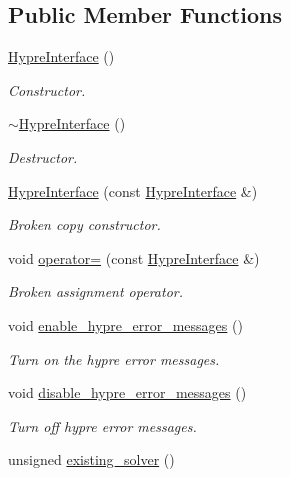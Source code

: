 \subsection*{Public Member Functions}
\begin{DoxyCompactItemize}
\item 
\hyperlink{classoomph_1_1HypreInterface_a411f8026204716846b34eec5a1296d28}{Hypre\+Interface} ()
\begin{DoxyCompactList}\small\item\em Constructor. \end{DoxyCompactList}\item 
\hyperlink{classoomph_1_1HypreInterface_a713e74ad0f84ae06be5c7daa87337ecf}{$\sim$\+Hypre\+Interface} ()
\begin{DoxyCompactList}\small\item\em Destructor. \end{DoxyCompactList}\item 
\hyperlink{classoomph_1_1HypreInterface_acd08f9cc3fc431619cb00ba3aff9af94}{Hypre\+Interface} (const \hyperlink{classoomph_1_1HypreInterface}{Hypre\+Interface} \&)
\begin{DoxyCompactList}\small\item\em Broken copy constructor. \end{DoxyCompactList}\item 
void \hyperlink{classoomph_1_1HypreInterface_adb32af31e0e519181f971410740520c9}{operator=} (const \hyperlink{classoomph_1_1HypreInterface}{Hypre\+Interface} \&)
\begin{DoxyCompactList}\small\item\em Broken assignment operator. \end{DoxyCompactList}\item 
void \hyperlink{classoomph_1_1HypreInterface_a281c9cf1e254871a957dbf46698cd518}{enable\+\_\+hypre\+\_\+error\+\_\+messages} ()
\begin{DoxyCompactList}\small\item\em Turn on the hypre error messages. \end{DoxyCompactList}\item 
void \hyperlink{classoomph_1_1HypreInterface_a5123a1836f5d9f68bc6736829132b5a5}{disable\+\_\+hypre\+\_\+error\+\_\+messages} ()
\begin{DoxyCompactList}\small\item\em Turn off hypre error messages. \end{DoxyCompactList}\item 
unsigned \hyperlink{classoomph_1_1HypreInterface_a976554ee58a357435c047f78a1539434}{existing\+\_\+solver} ()

\end{DoxyCompactItemize}

